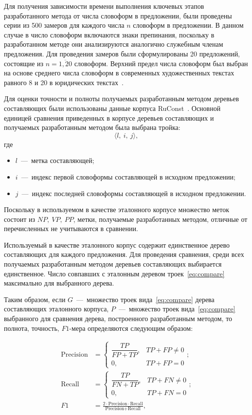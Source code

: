 Для получения зависимости времени выполнения ключевых этапов разработанного метода от числа словоформ в предложении, были проведены серии из 500 замеров для каждого числа $n$ словоформ в предложении. В данном случае в число словоформ включаются знаки препинания, поскольку в разработанном методе они анализируются аналогично служебным членам предложения. Для проведения замеров были сформулированы 20 предложений, состоящие из $n=\overline{1,20}$ словоформ. Верхний предел числа словоформ был выбран на основе среднего числа словоформ в современных художественных текстах равного 8 и 20 в юридических текстах~\cite{knutov2020complexity}.

Для оценки точности и полноты получаемых разработанным методом деревьев составляющих были использованы данные корпуса RuConst~\cite{Grashchenkov2024RuConst,grapaul_Ru_Const}. Основной единицей сравнения приведенных в корпусе деревьев составляющих и получаемых разработанным методом была выбрана тройка:
\begin{equation}
	\label{eq:compare}
	\langle l,\ i,\ j\rangle,
\end{equation}
где 
\begin{itemize}
	\item $l$~---~метка составляющей;
	\item $i$~---~индекс первой словоформы составляющей в исходном предложении;
	\item $j$~---~индекс последней словоформы составляющей в исходном предложении.
\end{itemize}

Поскольку в используемом в качестве эталонного корпусе множество меток состоит из $NP,\ VP,\ PP$, метки, получаемые разработанных методом, отличные от перечисленных не учитываются в сравнении.

Используемый в качестве эталонного корпус содержит единственное дерево составляющих для каждого предложения. Для проведения сравнения, среди всех получаемых разработанным методом деревьев составляющих выбирается единственное. Число совпавших с эталонным деревом троек~\ref{eq:compare} максимально для выбранного дерева.

Таким образом, если $G$~---~множество троек вида~\ref{eq:compare} дерева составляющих эталонного корпуса, $P$~---~множество троек вида~\ref{eq:compare} выбранного для сравнения дерева, построенного разработанным методом, то полнота, точность, $F1$-мера определяются следующим образом:

\begin{align}
	\label{eq:precision}
	\text{Precision} &= 
	\begin{cases}
		\dfrac{TP}{FP+TP}, & TP+FP \neq 0\\[6pt]
		0, & TP+FP = 0
	\end{cases}; \\
	\label{eq:recall}
	\text{Recall} &= 
	\begin{cases}
		\dfrac{TP}{FN+TP}, & TP+FN \neq 0\\[6pt]
		0, & TP+FN = 0
	\end{cases}; \\
	\label{eq:f1}
	F1 &= \frac{2 \cdot \text{Precision} \cdot \text{Recall}}{\text{Precision} + \text{Recall}},
\end{align}


